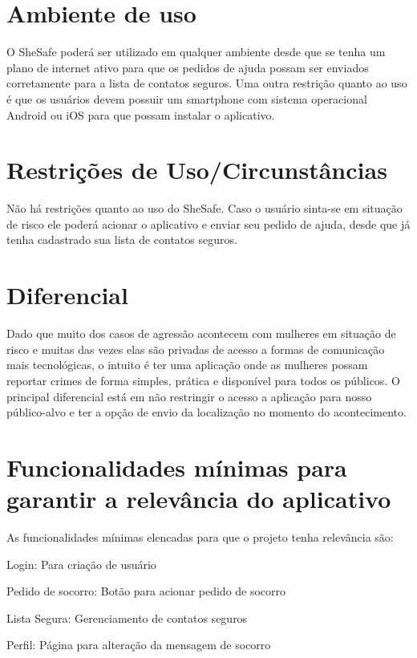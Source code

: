 \section{Ambiente de uso}
O SheSafe poderá ser utilizado em qualquer ambiente desde que se tenha um plano de internet ativo para que os pedidos de ajuda possam ser enviados corretamente para a lista de contatos seguros. Uma outra restrição quanto ao uso é que os usuários devem possuir um smartphone com sistema operacional Android ou iOS para que possam instalar o aplicativo.

\section{Restrições de Uso/Circunstâncias}
Não há restrições quanto ao uso do SheSafe. Caso o usuário sinta-se em situação de risco ele poderá acionar o aplicativo e enviar seu pedido de ajuda, desde que já tenha cadastrado sua lista de contatos seguros.

\section{Diferencial}
Dado que muito dos casos de agressão acontecem com mulheres em situação de risco e muitas das vezes elas são privadas de acesso a formas de comunicação mais tecnológicas, o intuito é ter uma aplicação onde as mulheres possam reportar crimes de forma simples, prática e disponível para todos os públicos. O principal diferencial está em não restringir o acesso a aplicação para nosso público-alvo e ter a opção de envio da localização no momento do acontecimento.

\section{Funcionalidades mínimas para garantir a relevância do aplicativo}
As funcionalidades mínimas elencadas para que o projeto tenha relevância são:
\begin{alineas}
  \item Login: Para criação de usuário
  \item Pedido de socorro: Botão para acionar pedido de socorro
  \item Lista Segura: Gerenciamento de contatos seguros
  \item Perfil: Página para alteração da mensagem de socorro

\end{alineas}
